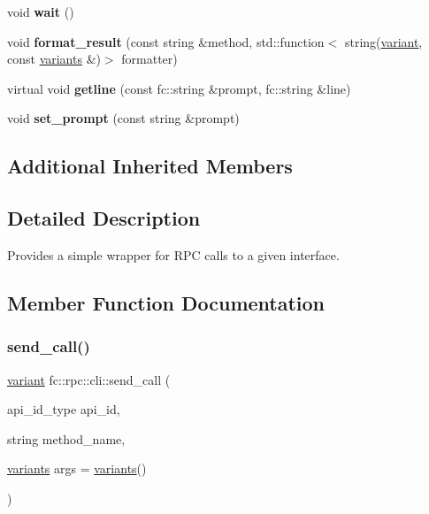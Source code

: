 \begin{DoxyCompactItemize}
void {\bfseries wait} ()
\item 
\mbox{\label{classfc_1_1rpc_1_1cli_af7966485df0bc34229281a078063f79b}} 
void {\bfseries format\+\_\+result} (const string \&method, std\+::function$<$ string(\mbox{\hyperlink{classfc_1_1variant}{variant}}, const \mbox{\hyperlink{classstd_1_1vector}{variants}} \&)$>$ formatter)
\item 
\mbox{\label{classfc_1_1rpc_1_1cli_a443954d4df8c200e9b07f9ef25a9782b}} 
virtual void {\bfseries getline} (const fc\+::string \&prompt, fc\+::string \&line)
\item 
\mbox{\label{classfc_1_1rpc_1_1cli_afbfce92d8307a2197c2d668c96f58f9c}} 
void {\bfseries set\+\_\+prompt} (const string \&prompt)
\end{DoxyCompactItemize}
\subsection*{Additional Inherited Members}


\subsection{Detailed Description}
Provides a simple wrapper for R\+PC calls to a given interface. 

\subsection{Member Function Documentation}
\mbox{\label{classfc_1_1rpc_1_1cli_ab42308885a2df6f53bef3c9407d5e775}} 
\subsubsection{\texorpdfstring{send\+\_\+call()}{send\_call()}}
{\footnotesize\ttfamily \mbox{\hyperlink{classfc_1_1variant}{variant}} fc\+::rpc\+::cli\+::send\+\_\+call (\begin{DoxyParamCaption}\item[{api\+\_\+id\+\_\+type}]{api\+\_\+id,  }\item[{string}]{method\+\_\+name,  }\item[{\mbox{\hyperlink{classstd_1_1vector}{variants}}}]{args = {\ttfamily \mbox{\hyperlink{classstd_1_1vector}{variants}}()} }\end{DoxyParamCaption})\hspace{0.3cm}{\ttfamily [virtual]}}

